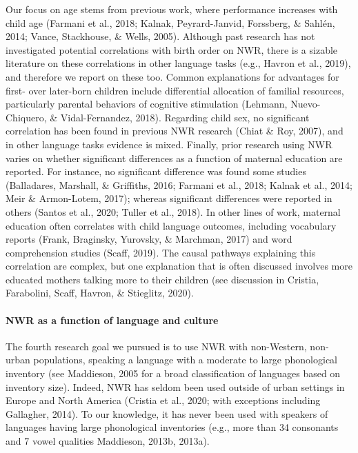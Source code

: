 \documentclass[
  american,
  ,man,floatsintext]{apa6}
\let\oldparagraph\paragraph
\renewcommand{\paragraph}[1]{\oldparagraph{#1}\mbox{}}
\begin{document}
Our focus on age stems from previous work, where performance increases with child age (Farmani et al., 2018; Kalnak, Peyrard-Janvid, Forssberg, \& Sahlén, 2014; Vance, Stackhouse, \& Wells, 2005). Although past research has not investigated potential correlations with birth order on NWR, there is a sizable literature on these correlations in other language tasks (e.g., Havron et al., 2019), and therefore we report on these too. Common explanations for advantages for first- over later-born children include differential allocation of familial resources, particularly parental behaviors of cognitive stimulation (Lehmann, Nuevo-Chiquero, \& Vidal-Fernandez, 2018). Regarding child sex, no significant correlation has been found in previous NWR research (Chiat \& Roy, 2007), and in other language tasks evidence is mixed. Finally, prior research using NWR varies on whether significant differences as a function of maternal education are reported. For instance, no significant difference was found some studies (Balladares, Marshall, \& Griffiths, 2016; Farmani et al., 2018; Kalnak et al., 2014; Meir \& Armon-Lotem, 2017); whereas significant differences were reported in others (Santos et al., 2020; Tuller et al., 2018). In other lines of work, maternal education often correlates with child language outcomes, including vocabulary reports (Frank, Braginsky, Yurovsky, \& Marchman, 2017) and word comprehension studies (Scaff, 2019). The causal pathways explaining this correlation are complex, but one explanation that is often discussed involves more educated mothers talking more to their children (see discussion in Cristia, Farabolini, Scaff, Havron, \& Stieglitz, 2020).

\hypertarget{nwr-as-a-function-of-language-and-culture}{%
\paragraph{NWR as a function of language and culture}\label{nwr-as-a-function-of-language-and-culture}}

The fourth research goal we pursued is to use NWR with non-Western, non-urban populations, speaking a language with a moderate to large phonological inventory (see Maddieson, 2005 for a broad classification of languages based on inventory size). Indeed, NWR has seldom been used outside of urban settings in Europe and North America (Cristia et al., 2020; with exceptions including Gallagher, 2014). To our knowledge, it has never been used with speakers of languages having large phonological inventories (e.g., more than 34 consonants and 7 vowel qualities Maddieson, 2013b, 2013a).
\end{document}
